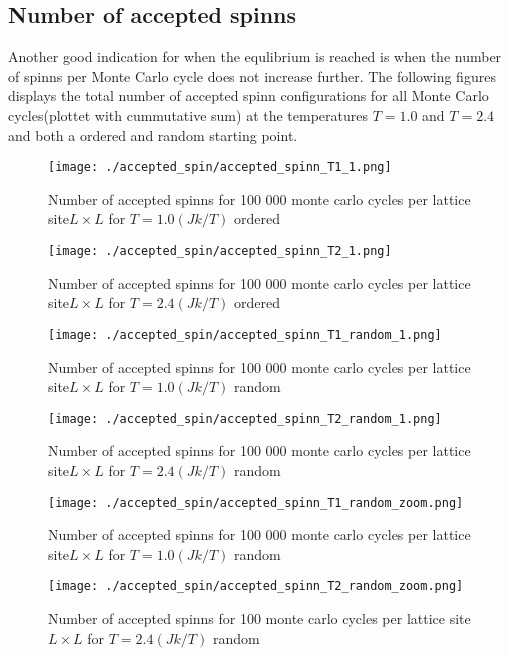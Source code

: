 \documentclass[../main.tex]{subfiles}
\begin{document}
\subsection*{Number of accepted spinns}
Another good indication for when the equlibrium is reached is when the number of spinns per Monte Carlo cycle does not increase further.  The following figures displays the total number of accepted spinn configurations for all Monte Carlo cycles(plottet with cummutative sum) at the temperatures $T = 1.0$ and $T = 2.4$ and both a ordered and random starting point.

\begin{figure}[!ht]
  \centering
  \parbox{5cm}{
  \texttt{[image: ./accepted\_spin/accepted\_spinn\_T1\_1.png]}
  \caption{Number of accepted spinns for 100 000 monte carlo cycles per lattice site$L\times L$ for $T= 1.0(Jk/T)$ ordered}
  \label{fig:accepted_spinnT1}}
  \qquad
  \begin{minipage}{5cm}
    \texttt{[image: ./accepted\_spin/accepted\_spinn\_T2\_1.png]}
    \caption{Number of accepted spinns for 100 000 monte carlo cycles per lattice site$L\times L$ for $T= 2.4(Jk/T)$ ordered}
    \label{fig:accepted_spinnT2}
  \end{minipage}
  \end{figure}
\FloatBarrier

\begin{figure}[!ht]
  \centering
  \parbox{5cm}{
  \texttt{[image: ./accepted\_spin/accepted\_spinn\_T1\_random\_1.png]}
  \caption{Number of accepted spinns for 100 000 monte carlo cycles per lattice site$L\times L$ for $T= 1.0(Jk/T)$ random}
  \label{fig:accepted_spinnT1_random}}
  \qquad
  \begin{minipage}{5cm}
    \texttt{[image: ./accepted\_spin/accepted\_spinn\_T2\_random\_1.png]}
    \caption{Number of accepted spinns for 100 000 monte carlo cycles per lattice site$L\times L$ for $T= 2.4(Jk/T)$ random}
    \label{fig:accepted_spinnT2_random}
  \end{minipage}
  \end{figure}
\FloatBarrier

\begin{figure}[!ht]
  \centering
  \parbox{5cm}{
  \texttt{[image: ./accepted\_spin/accepted\_spinn\_T1\_random\_zoom.png]}
  \caption{Number of accepted spinns for 100 000 monte carlo cycles per lattice site$L\times L$ for $T= 1.0(Jk/T)$ random}
  \label{fig:accepted_spinnT1_random_zoom}}
  \qquad
  \begin{minipage}{5cm}
    \texttt{[image: ./accepted\_spin/accepted\_spinn\_T2\_random\_zoom.png]}
    \caption{Number of accepted spinns for 100 monte carlo cycles per lattice site$L\times L$ for $T= 2.4(Jk/T)$ random}
    \label{fig:accepted_spinnT2_random_zoom}
  \end{minipage}
  \end{figure}
\FloatBarrier
\end{document}
